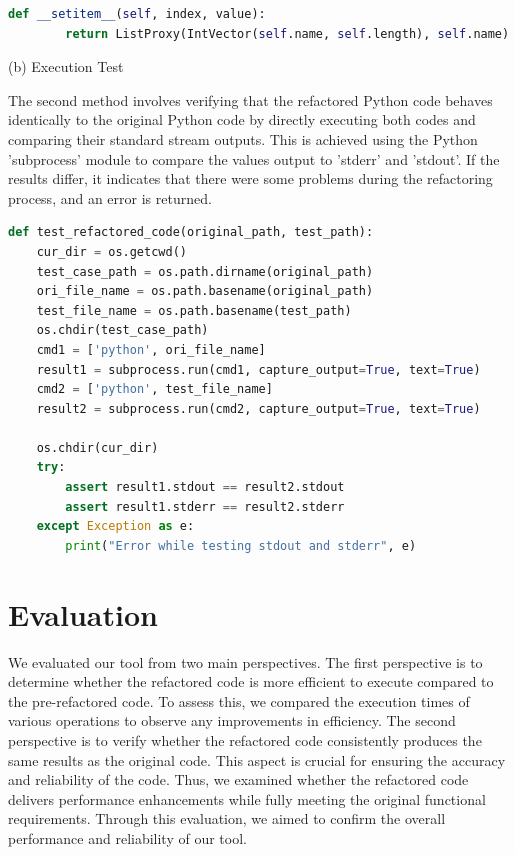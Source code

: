 \documentclass[11pt]{article}
\begin{document}
\begin{lstlisting}[language=python]
def __setitem__(self, index, value):
        return ListProxy(IntVector(self.name, self.length), self.name).__setitem__(index, value)
\end{lstlisting}

(b) Execution Test

The second method involves verifying that the refactored Python code behaves identically to the original Python code by directly executing both codes and comparing their standard stream outputs. This is achieved using the Python 'subprocess' module to compare the values output to 'stderr' and 'stdout'. If the results differ, it indicates that there were some problems during the refactoring process, and an error is returned. \\

\begin{lstlisting}[language=python]
def test_refactored_code(original_path, test_path):
    cur_dir = os.getcwd()
    test_case_path = os.path.dirname(original_path)
    ori_file_name = os.path.basename(original_path)
    test_file_name = os.path.basename(test_path)
    os.chdir(test_case_path)
    cmd1 = ['python', ori_file_name]
    result1 = subprocess.run(cmd1, capture_output=True, text=True)
    cmd2 = ['python', test_file_name]
    result2 = subprocess.run(cmd2, capture_output=True, text=True)

    os.chdir(cur_dir)
    try:
        assert result1.stdout == result2.stdout
        assert result1.stderr == result2.stderr
    except Exception as e:
        print("Error while testing stdout and stderr", e)
\end{lstlisting}

\section{Evaluation}

We evaluated our tool from two main perspectives. The first perspective is to determine whether the refactored code is more efficient to execute compared to the pre-refactored code. To assess this, we compared the execution times of various operations to observe any improvements in efficiency. The second perspective is to verify whether the refactored code consistently produces the same results as the original code. This aspect is crucial for ensuring the accuracy and reliability of the code. Thus, we examined whether the refactored code delivers performance enhancements while fully meeting the original functional requirements. Through this evaluation, we aimed to confirm the overall performance and reliability of our tool.
\end{document}
